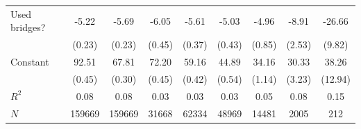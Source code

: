 \begin{center}
\begin{tabular}{lcccccccc}
        Used bridges?        & -5.22 & -5.69 & -6.05 & -5.61 & -5.03 & -4.96 & -8.91 & -26.66 \\
                             & (0.23) & (0.23) & (0.45) & (0.37) & (0.43) & (0.85) & (2.53) & (9.82) \\
        Constant             & 92.51 & 67.81 & 72.20 & 59.16 & 44.89 & 34.16 & 30.33 & 38.26 \\
                             & (0.45) & (0.30) & (0.45) & (0.42) & (0.54) & (1.14) & (3.23) & (12.94) \\
        \hline
        $R^2$ & 0.08 & 0.08 & 0.03 & 0.03 & 0.03 & 0.05 & 0.08 & 0.15 \\
        $N$ & 159669 & 159669 & 31668 & 62334 & 48969 & 14481 & 2005 & 212 \\
        \hline
    \end{tabular}
\end{center}
